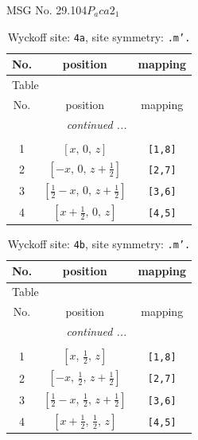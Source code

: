 \documentclass[fleqn,8pt]{jsarticle}
\begin{document}
\setcounter{MaxMatrixCols}{32}

\renewcommand{\tablename}{Table~}
\renewcommand{\figurename}{Figure~}
\begin{center}
\LARGE
MSG No. 29.104\quad$P_{a}ca2_{1}$
\end{center}
\renewcommand{\arraystretch}{1.2}
\begin{longtable}{ccc}
\caption{Wyckoff site: {\tt 4a}, site symmetry: {\tt .m'.}}
 \\
 \hline \hline
No. & position & mapping \\ \hline \endfirsthead

\multicolumn{2}{l}{\tablename\ \thetable{}} \\
 \hline \hline
No. & position & mapping \\ \hline \endhead

 \hline \hline
\multicolumn{2}{r}{\footnotesize\it continued ...} \\ \endfoot

 \hline \hline
\multicolumn{2}{r}{} \\ \endlastfoot

1 & $\left[ x,\, 0,\, z \right]$ & {\tt [1,8]} \\ \hline
2 & $\left[ - x,\, 0,\, z + \frac{1}{2} \right]$ & {\tt [2,7]} \\ \hline
3 & $\left[ \frac{1}{2} - x,\, 0,\, z + \frac{1}{2} \right]$ & {\tt [3,6]} \\ \hline
4 & $\left[ x + \frac{1}{2},\, 0,\, z \right]$ & {\tt [4,5]} \\
\end{longtable}
\renewcommand{\arraystretch}{1.2}
\begin{longtable}{ccc}
\caption{Wyckoff site: {\tt 4b}, site symmetry: {\tt .m'.}}
 \\
 \hline \hline
No. & position & mapping \\ \hline \endfirsthead

\multicolumn{2}{l}{\tablename\ \thetable{}} \\
 \hline \hline
No. & position & mapping \\ \hline \endhead

 \hline \hline
\multicolumn{2}{r}{\footnotesize\it continued ...} \\ \endfoot

 \hline \hline
\multicolumn{2}{r}{} \\ \endlastfoot

1 & $\left[ x,\, \frac{1}{2},\, z \right]$ & {\tt [1,8]} \\ \hline
2 & $\left[ - x,\, \frac{1}{2},\, z + \frac{1}{2} \right]$ & {\tt [2,7]} \\ \hline
3 & $\left[ \frac{1}{2} - x,\, \frac{1}{2},\, z + \frac{1}{2} \right]$ & {\tt [3,6]} \\ \hline
4 & $\left[ x + \frac{1}{2},\, \frac{1}{2},\, z \right]$ & {\tt [4,5]} \\
\end{longtable}
\end{document}
